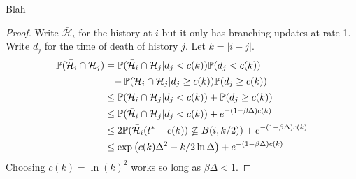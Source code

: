 	\begin{lemma}
		Blah
	\end{lemma}
	\begin{proof}
		Write $\bar{\mathcal{H}}_i$ for the history at $i$ but it only has branching updates at rate 1. Write $d_j$ for the time of death of history $j$. Let $k = |i-j|$.
		\begin{align}
			\mathbb{P}(\bar{\mathcal{H}}_i \cap \mathcal{H}_j) &= \mathbb{P}(\bar{\mathcal{H}}_i \cap \mathcal{H}_j | d_j < c(k)) \mathbb{P}(d_j < c(k)) \notag \\
			&\phantom{=}+ \mathbb{P}(\bar{\mathcal{H}}_i \cap \mathcal{H}_j | d_j \geq c(k)) \mathbb{P}(d_j \geq c(k))\\
			&\leq \mathbb{P}(\bar{\mathcal{H}}_i \cap \mathcal{H}_j | d_j < c(k)) + \mathbb{P}(d_j \geq c(k))\\
			&\leq \mathbb{P}(\bar{\mathcal{H}}_i \cap \mathcal{H}_j | d_j < c(k)) + e^{-(1 - \beta \Delta) c(k)}\\
			&\leq 2\mathbb{P}(\bar{\mathcal{H}}_i(t^* - c(k)) \nsubseteq B(i, k/2)) + e^{-(1 - \beta \Delta) c(k)}\\
			&\leq \exp\left(c(k) \Delta^2 - k/2 \ln \Delta \right) + e^{-(1 - \beta \Delta) c(k)}\\
		\end{align}
		Choosing $c(k) = \ln(k)^2$ works so long as $\beta \Delta < 1$.
	\end{proof}


